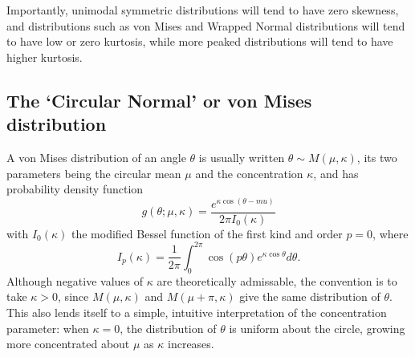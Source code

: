 \documentclass[../../ArchStats.tex]{subfiles}
\begin{document}
Importantly, unimodal symmetric distributions will tend to have zero skewness, and distributions such as von Mises and Wrapped Normal distributions will tend to have low or zero kurtosis, while more peaked distributions will tend to have higher kurtosis.




\subsection{The `Circular Normal' or von Mises distribution}



A von Mises distribution of an angle $\theta$ is usually written $\theta \sim M(\mu, \kappa)$, its two parameters being the circular mean $\mu$ and the concentration $\kappa$, and has probability density function
\[g(\theta; \mu, \kappa) = \frac{e^{\kappa \cos(\theta - mu)}}{2\pi I_0(\kappa)}\]
with $I_0(\kappa)$ the modified Bessel function of the first kind and order $p=0$, where
\[I_p(\kappa) = \frac{1}{2\pi}\int_0^{2\pi} \cos(p\theta)e^{\kappa \cos \theta} d\theta.\]
Although negative values of $\kappa$ are theoretically admissable, the convention is to take $\kappa > 0$, since $M(\mu, \kappa)$ and $M(\mu + \pi, \kappa)$ give the same distribution of $\theta$. This also lends itself to a simple, intuitive interpretation of the concentration parameter: when $\kappa = 0$, the distribution of $\theta$ is uniform about the circle, growing more concentrated about $\mu$ as $\kappa$ increases. 
\end{document}
